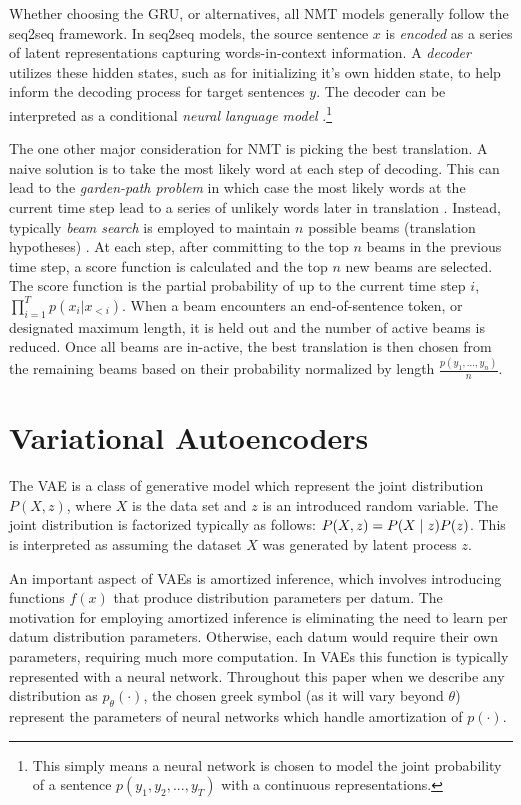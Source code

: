 Whether choosing the \ac{GRU}, or alternatives,  all \ac{NMT} models generally follow the \ac{seq2seq} framework. In \ac{seq2seq} models, the source sentence $x$ is \textit{encoded} as a series of latent representations capturing words-in-context information. A \textit{decoder} utilizes these hidden states, such as for initializing it's own hidden state, to help inform the decoding process for target sentences $y$. The decoder can be interpreted as a conditional \textit{neural language model} \cite{koehn2017NMT}.\footnote{This simply means a neural network is chosen to model the joint probability of a sentence $p(y_{1}, y_{2}, ..., y_{T})$ with a continuous representations.}

The one other major consideration for \ac{NMT} is picking the best translation. A naive solution is to take the most likely word at each step of decoding. This can lead to the \textit{garden-path problem} in which case the most likely words at the current time step lead to a series of unlikely words later in translation \cite{koehn2017NMT}. Instead, typically \textit{beam search} is employed to maintain $n$ possible beams (translation hypotheses) \cite{koehn2017NMT}. At each step, after committing to the top $n$ beams  in the previous time step, a score function is calculated and the top $n$ new beams are selected. The score function is the partial probability of up to the current time step $i$, $\prod^{T}_{i=1} p(x_{i} | x_{<i})$. When a beam encounters an end-of-sentence token, or designated maximum length, it is held out and the number of active beams is reduced. Once all beams are in-active, the best translation is then chosen from the remaining beams based on their probability normalized by length $\frac{p(y_{1}, ..., y_{n})}{n}$. 



\section{Variational Autoencoders}

The \ac{VAE} is a class of generative model which represent the joint distribution $P(X, z)$, where $X$ is the data set and $z$ is an introduced random variable. The joint distribution is factorized typically as follows: $P(X, z) = P(X\; | \;{z})P(z)$. This is interpreted as assuming the dataset $X$ was generated by latent process  $z$. 

An important aspect of \ac{VAE}s is amortized inference, which involves introducing functions $f(x)$ that produce distribution parameters per datum. The motivation for employing amortized inference is eliminating the need to learn per datum distribution parameters. Otherwise, each datum would require their own parameters, requiring much more computation. In \ac{VAE}s this function is typically represented with a neural network. Throughout this paper when we describe any distribution as $p_{\theta}(\cdot)$, the chosen greek symbol (as it will vary beyond $\theta$) represent the parameters of neural networks which handle amortization of $p(\cdot)$. 

